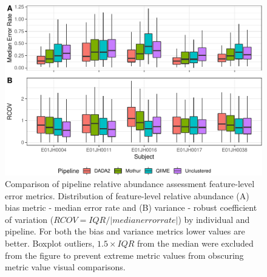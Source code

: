 \documentclass[linenumbers]{bmcart}
\begin{document}
\begin{figure}
\centering
\includegraphics{relAbuErrorMetrics-1.pdf}
\caption{\label{fig:relAbuErrorMetrics}Comparison of pipeline relative
abundance assessment feature-level error metrics. Distribution of
feature-level relative abundance (A) bias metric - median error rate and
(B) variance - robust coefficient of variation (\(RCOV=IQR/|median error rate|\)) by individual and pipeline.
For both the bias and variance metrics lower values are better.
Boxplot outliers, \(1.5\times IQR\) from the median were excluded from the figure to prevent extreme metric values
from obscuring metric value visual comparisons.}
\end{figure}

\begin{table}
\caption{\label{tab:relAbuErrorTbl}Maximum feature-level error rate bias (median error rate) and variance (robust COV) by pipeline and individual.}
\centering
{}
\end{table}
\end{document}
